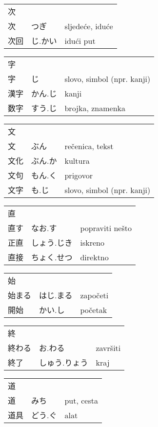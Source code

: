 

\newenvironment{dictentry}[1]{
	\begin{tabular}{p{2cm} p{3cm} p{10cm}}
		#1 &&\\
}{
	\end{tabular}
	\vspace{20pt}
}

\newcommand{\example}[3]{
	\hspace*{\fill}#1 & #2 & #3\\
}

\author{ロボット君}


\begin{dictentry}{次}
\example{次}{つぎ}{sljedeće, iduće}
\example{次回}{じ.かい}{idući put}
\end{dictentry}

\begin{dictentry}{字}
\example{字}{じ}{slovo, simbol (npr. kanji)}
\example{漢字}{かん.じ}{kanji}
\example{数字}{すう.じ}{brojka, znamenka}
\end{dictentry}

\begin{dictentry}{文}
\example{文}{ぶん}{rečenica, tekst}
\example{文化}{ぶん.か}{kultura}
\example{文句}{もん.く}{prigovor}
\example{文字}{も.じ\footnotemark[1]}{slovo, simbol (npr. kanji)}
\end{dictentry}

\begin{dictentry}{直}
\example{直す}{なお.す}{popraviti nešto}
\example{正直}{しょう.じき}{iskreno}
\example{直接}{ちょく.せつ}{direktno}
\end{dictentry}

\begin{dictentry}{始}
\example{始まる}{はじ.まる}{započeti}
\example{開始}{かい.し}{početak}
\end{dictentry}

\begin{dictentry}{終}
\example{終わる}{お.わる}{završiti}
\example{終了}{しゅう.りょう}{kraj}
\end{dictentry}

\begin{dictentry}{道}
\example{道}{みち}{put, cesta}
\example{道具}{どう.ぐ}{alat}
\end{dictentry}

